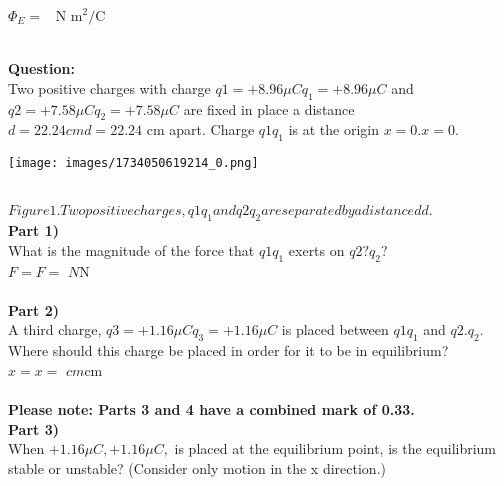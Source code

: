 \documentclass[addpoints,12pt, margin-left=35px]{exam}
\begin{document}
$ \Phi_E = $  \underline{\hspace{3cm}}  $\text{N m}^2 \text{/C}$ \\

\\

\newpage

\textbf{Question:}\\

Two positive charges with charge $q1=+8.96μCq_1 = +{8.96} \mu C$ and $q2=+7.58μCq_2 = +{7.58} \mu C$ are fixed in place a distance $d=22.24 cmd = {22.24} \text{ cm}$ apart. Charge $q1q_1$ is at the origin $x=0.x=0.$\\

\begin{center}
\texttt{[image: images/1734050619214\_0.png]}
\end{center}\\

$Figure 1. Two positive charges, q1q_1 and q2q_2 are separated by a distance dd. $\\

\textbf{Part 1)}\\

What is the magnitude of the force that $q1q_1$ exerts on $q2?q_2?$\\

$F= F = $  \underline{\hspace{3cm}}  $N\text{N}$ \\

\\

\textbf{Part 2)}\\

A third charge, $q3=+1.16μCq_3 = +{1.16} \mu C$ is placed between $q1q_1$ and $q2.q_2.$ Where should this charge be placed in order for it to be in equilibrium?\\

$x= x = $  \underline{\hspace{3cm}}  $cm\text{cm}$ \\

\\

\textbf{Please note: Parts 3 and 4 have a combined mark of 0.33.}\\

\textbf{Part 3)}\\

When $+1.16μC,+ {1.16} \mu C,$ is placed at the equilibrium point, is the equilibrium stable or unstable? (Consider only motion in the x direction.)\\
\end{document}
